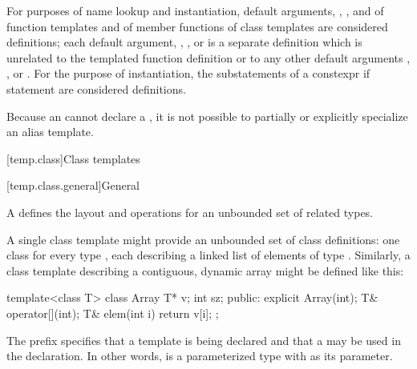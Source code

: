 \pnum
For purposes of name lookup and instantiation,
default arguments,
,
,
and
of function templates
and
of member functions of class templates
are considered definitions;
each
default argument,
,
,
or
is a separate definition
which is unrelated
to the templated function definition or
to any other
default arguments
,
,
or
.
For the purpose of instantiation, the substatements of a constexpr if
statement are considered definitions.

\pnum
Because an  cannot declare a
, it is not possible to partially or
explicitly specialize an alias template.

[temp.class]{Class templates}

[temp.class.general]{General}

\pnum
A
defines the layout and operations
for an unbounded set of related types.

\pnum
\begin{example}
A single class template
might provide an unbounded set of class definitions:
one class  for every type ,
each describing a linked list of elements of type .
Similarly, a class template  describing a contiguous,
dynamic array might be defined like this:
\begin{codeblock}
template<class T> class Array {
  T* v;
  int sz;
public:
  explicit Array(int);
  T& operator[](int);
  T& elem(int i) { return v[i]; }
};
\end{codeblock}
The prefix 
specifies that a template is being declared and that a
may be used in the declaration.
In other words,
is a parameterized type with
as its parameter.
\end{example}

